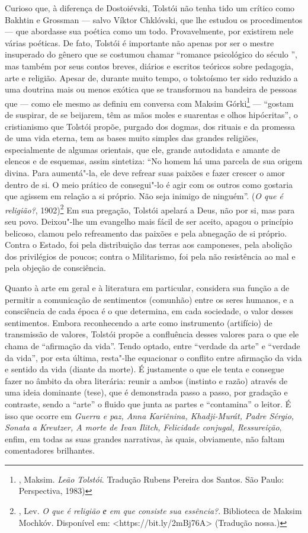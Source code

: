 Curioso que, à diferença de Dostoiévski, Tolstói não tenha tido
um crítico como Bakhtin e Grossman --- salvo Víktor Chklóvski,
que lhe estudou os procedimentos --- que abordasse sua poética
como um todo. Provavelmente, por existirem nele várias poéticas.
De fato, Tolstói é importante não apenas por ser o mestre
insuperado do gênero que se costumou chamar ``romance psicológico
do século '', mas também por seus contos breves,
diários e escritos teóricos sobre pedagogia, arte e religião.
Apesar de, durante muito tempo, o tolstoísmo ter sido reduzido
a uma doutrina mais ou menos exótica que se transformou na
bandeira de pessoas que --- como ele mesmo as definiu em conversa
com Maksim Górki\footnote{, Maksim. \emph{Leão
Tolstói}. Tradução Rubens Pereira dos Santos. São Paulo:
Perspectiva, 1983)} --- ``gostam de suspirar, de se beijarem,
têm as mãos moles e suarentas e olhos hipócritas'', o
cristianismo que Tolstói propõe, purgado dos dogmas, dos
rituais e da promessa de uma vida eterna, tem as bases muito
simples das grandes religiões, especialmente de algumas orientais,
que ele, grande autodidata e amante de elencos e de esquemas,
assim sintetiza: ``No homem há uma parcela de sua origem divina.
Para aumentá"-la, ele deve refrear suas paixões e fazer crescer o
amor dentro de si. O meio prático de consegui"-lo é agir com os
outros como gostaria que agissem em relação a si próprio. Não
seja inimigo de ninguém''. (\emph{O que é religião?},
1902)\footnote{, Lev. \emph{O que é religião е
em que consiste sua essência?}. Biblioteca de Maksim Mochkóv.
Disponível em: \textless{}https://bit.ly/2mBj76A\textgreater{}
(Tradução nossa.)} Em sua pregação, Tolstói apelará a Deus, não por si, mas
para seu povo. Deixou"-lhe um evangelho mais fácil de ser aceito, apagou
o princípio belicoso, clamou pelo refreamento das paixões e pela
abnegação de si próprio. Contra o Estado, foi pela distribuição
das terras aos camponeses, pela abolição dos privilégios de
poucos; contra o Militarismo, foi pela não resistência ao mal e
pela objeção de consciência.

Quanto à arte em geral e à literatura em particular, considera sua
função a de permitir a comunicação de sentimentos (comunhão) entre
os seres humanos, e a consciência de cada época é o que determina,
em cada sociedade, o valor desses sentimentos. Embora reconhecendo
a arte como instrumento (artifício) de transmissão de valores,
Tolstói propõe a confluência desses valores para o que ele chama
de ``afirmação da vida''. Tendo optado, entre ``verdade da arte''
e ``verdade da vida'', por esta última, resta"-lhe equacionar o
conflito entre afirmação da vida e sentido da vida (diante da
morte). É justamente o que ele tenta e consegue fazer no âmbito
da obra literária: reunir a ambos (instinto e razão) através de
uma ideia dominante (tese), que é demonstrada passo a passo, por
gradação e contraste, sendo a ``arte'' o fluido que junta as
partes e ``contamina'' o leitor. É isso que ocorre em \emph{Guerra
e paz, Anna Kariênina, Khadji-Murát, Padre Sérgio, Sonata a
Kreutzer, A morte de Ivan Ilitch, Felicidade conjugal,
Ressureição}, enfim, em todas as suas grandes narrativas, às
quais, obviamente, não faltam comentadores brilhantes.

